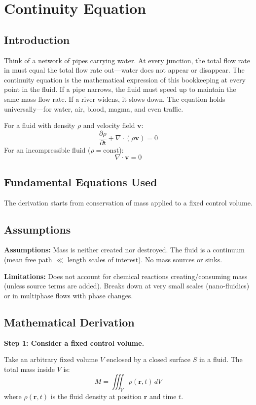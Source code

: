 \chapter{Continuity Equation}

\section*{Introduction}

Think of a network of pipes carrying water. At every junction, the total flow rate in must equal the total flow rate out---water does not appear or disappear. The continuity equation is the mathematical expression of this bookkeeping at every point in the fluid. If a pipe narrows, the fluid must speed up to maintain the same mass flow rate. If a river widens, it slows down. The equation holds universally---for water, air, blood, magma, and even traffic.


For a fluid with density $\rho$ and velocity field $\mathbf{v}$:
\[
\frac{\partial \rho}{\partial t} + \nabla \cdot (\rho \mathbf{v}) = 0
\]
For an incompressible fluid ($\rho = \text{const}$):
\[
\nabla \cdot \mathbf{v} = 0
\]

\section*{Fundamental Equations Used}

The derivation starts from conservation of mass applied to a fixed control volume.

\section*{Assumptions}

\textbf{Assumptions:} Mass is neither created nor destroyed. The fluid is a continuum (mean free path $\ll$ length scales of interest). No mass sources or sinks.


\textbf{Limitations:} Does not account for chemical reactions creating/consuming mass (unless source terms are added). Breaks down at very small scales (nano-fluidics) or in multiphase flows with phase changes.


\section*{Mathematical Derivation}

\textbf{Step 1: Consider a fixed control volume.}

Take an arbitrary fixed volume $V$ enclosed by a closed surface $S$ in a fluid. The total mass inside $V$ is:
\begin{equation}
M = \iiint_V \rho(\mathbf{r}, t)\, dV
\end{equation}
where $\rho(\mathbf{r}, t)$ is the fluid density at position $\mathbf{r}$ and time $t$.

